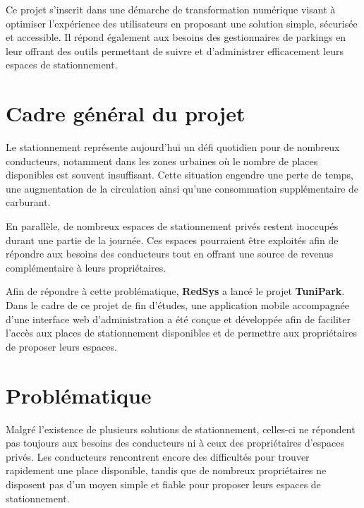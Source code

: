 \par Ce projet s'inscrit dans une démarche de transformation numérique visant à optimiser l'expérience des utilisateurs en proposant une solution simple, sécurisée et accessible. Il répond également aux besoins des gestionnaires de parkings en leur offrant des outils permettant de suivre et d'administrer efficacement leurs espaces de stationnement.






\section{Cadre général du projet}

\par Le stationnement représente aujourd'hui un défi quotidien pour de nombreux conducteurs, notamment dans les zones urbaines où le nombre de places disponibles est souvent insuffisant. Cette situation engendre une perte de temps, une augmentation de la circulation ainsi qu'une consommation supplémentaire de carburant.

\par En parallèle, de nombreux espaces de stationnement privés restent inoccupés durant une partie de la journée. Ces espaces pourraient être exploités afin de répondre aux besoins des conducteurs tout en offrant une source de revenus complémentaire à leurs propriétaires.

\par Afin de répondre à cette problématique, \textbf{RedSys} a lancé le projet \textbf{TuniPark}. Dans le cadre de ce projet de fin d'études, une application mobile accompagnée d'une interface web d'administration a été conçue et développée afin de faciliter l'accès aux places de stationnement disponibles et de permettre aux propriétaires de proposer leurs espaces.

\section{Problématique}

\par Malgré l'existence de plusieurs solutions de stationnement, celles-ci ne répondent pas toujours aux besoins des conducteurs ni à ceux des propriétaires d'espaces privés. Les conducteurs rencontrent encore des difficultés pour trouver rapidement une place disponible, tandis que de nombreux propriétaires ne disposent pas d'un moyen simple et fiable pour proposer leurs espaces de stationnement.

